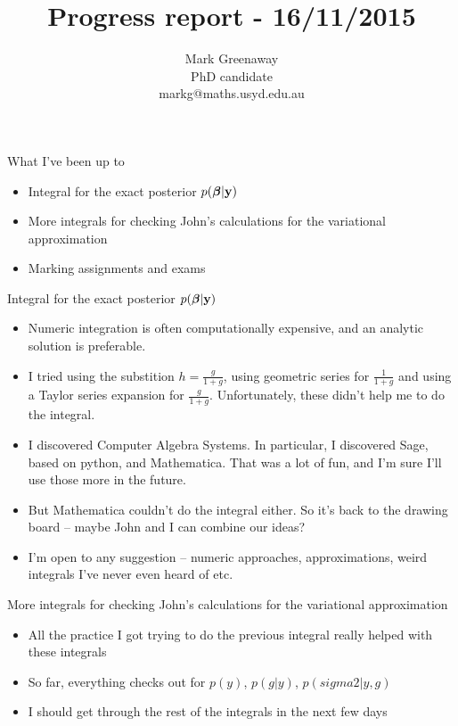 \documentclass{beamer}
\title{Progress report - 16/11/2015}
\author{Mark Greenaway\\PhD candidate\\markg@maths.usyd.edu.au}
\begin{document}
\begin{frame}
	\maketitle
\end{frame}

\begin{frame}{What I've been up to}
	\begin{itemize}
		\item Integral for the exact posterior $p({\boldsymbol \beta}|{\bf y})$
		\item More integrals for checking John's calculations for the variational approximation
		\item Marking assignments and exams
	\end{itemize}
\end{frame}


\begin{frame}{Integral for the exact posterior $p({\boldsymbol \beta}|{\bf y})$}
	\begin{itemize}
		\item Numeric integration is often computationally expensive, and an analytic solution is preferable.
		\item I tried using the substition $h=\frac{g}{1 + g}$, using geometric series for $\frac{1}{1 + g}$
					and using a Taylor series expansion for $\frac{g}{1 + g}$. Unfortunately, these didn't help me
					to do the integral.
		\item I discovered Computer Algebra Systems. In particular, I discovered Sage, based on python, and
					Mathematica. That was a lot of fun, and I'm sure I'll use those more in the future.
		\item But Mathematica couldn't do the integral either. So it's back to the drawing board -- maybe John
					and I can combine our ideas?
		\item I'm open to any suggestion -- numeric approaches, approximations, weird integrals I've never even
					heard of etc.
	\end{itemize}
\end{frame}


\begin{frame}{More integrals for checking John's calculations for the variational approximation}
	\begin{itemize}
		\item All the practice I got trying to do the previous integral really helped with these integrals
		\item So far, everything checks out for $p(y)$, $p(g|y)$, $p(sigma2|y, g)$
		\item I should get through the rest of the integrals in the next few days
	\end{itemize}
\end{frame}
\end{document}
